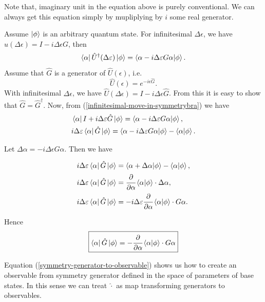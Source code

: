 \documentclass[main.tex]{subfiles}
\begin{document}
Note that, imaginary unit in the equation above is purely conventional. We can always get this equation simply by mupliplying by $i$ some real generator.

Assume $\ket{\phi}$ is an arbitrary quantum state. For infinitesimal $\Delta \epsilon$, we have $u(\Delta\epsilon) = I - i\Delta\epsilon G$, then
\begin{equation}
\label{infinitesimal-move-in-symmetrybra}
\bra{\alpha} \hat{U}^{\dagger}(\Delta \varepsilon)\ket{\phi} = \bra{\alpha - i\Delta\varepsilon G\alpha}\ket{\phi}.
\end{equation}
Assume that $\hat{G}$ is a generator of $\hat{U}(\epsilon)$, i.e.
\begin{equation}
\hat{U}(\epsilon) = e^{-i\epsilon \hat{G}}.
\end{equation}
With infinitesimal $\Delta \epsilon$, we have $\hat{U}(\Delta \epsilon) = I - i\Delta\epsilon \hat{G}$. From this it is easy to show that $\hat{G} = \hat{G}^\dagger$. 
Now, from (\ref{infinitesimal-move-in-symmetrybra}) we have
\begin{align*}
& \bra{\alpha} I + i\Delta\varepsilon \hat{G} \ket{\phi} = \bra{\alpha -i \Delta\varepsilon G\alpha}\ket{\phi},\\
& i \Delta\varepsilon \bra{\alpha} \hat{G}\ket{\phi} = \bra{\alpha -i \Delta\varepsilon G\alpha}\ket{\phi} - \bra{\alpha}\ket{\phi}.
\end{align*} 

Let $\Delta \alpha = -i \Delta\epsilon G\alpha$. Then we have

\begin{align*}
& i \Delta\varepsilon \bra{\alpha} \hat{G}\ket{\phi} = \bra{\alpha + \Delta\alpha}\ket{\phi} - \bra{\alpha}\ket{\phi},\\
& i \Delta\varepsilon \bra{\alpha} \hat{G}\ket{\phi} = \cfrac{\partial}{\partial \alpha} \bra{\alpha}\ket{\phi} \cdot \Delta\alpha,\\
& i \Delta\varepsilon \bra{\alpha} \hat{G}\ket{\phi} = -i \Delta \varepsilon \cfrac{\partial}{\partial \alpha}  \bra{\alpha}\ket{\phi} \cdot G\alpha.
\end{align*}

Hence
\begin{equation}
\label{symmetry-generator-to-observable}
\boxed{
\bra{\alpha} \hat{G}\ket{\phi} = - \cfrac{\partial}{\partial \alpha}  \bra{\alpha}\ket{\phi} \cdot G\alpha
}
\end{equation}

Equation (\ref{symmetry-generator-to-observable}) shows us how to create an observable 
from symmetry generator defined in the space of parameters of base states. In this sense we can treat $\hat{\cdot}$ as map transforming generators to observables.
\end{document}
